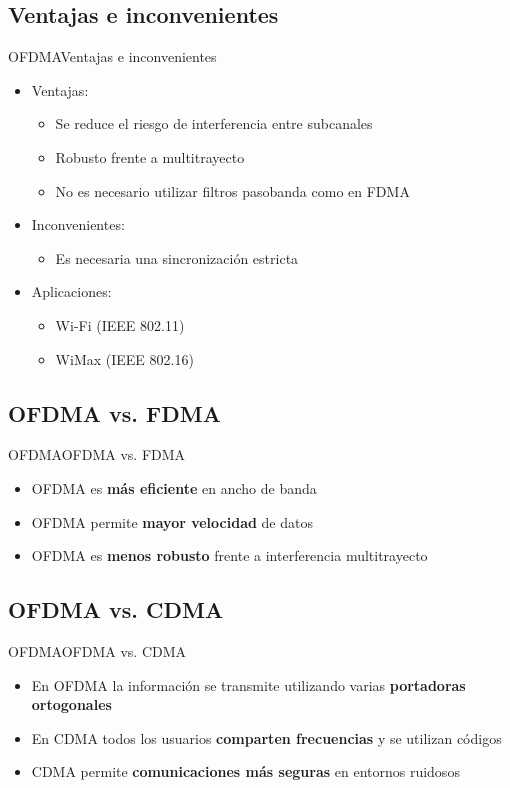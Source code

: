 \documentclass[10pt,compress]{beamer} %
\begin{document}
\subsection{Ventajas e inconvenientes}
\begin{frame}{OFDMA}{Ventajas e inconvenientes}
  \begin{itemize}
    \item Ventajas:
      \begin{itemize}
        \item Se reduce el riesgo de interferencia entre subcanales
        \item Robusto frente a multitrayecto
        \item No es necesario utilizar filtros pasobanda como en FDMA
      \end{itemize}
    \item Inconvenientes:
      \begin{itemize}
        \item Es necesaria una sincronización estricta
      \end{itemize}
    \item Aplicaciones:
      \begin{itemize}
        \item Wi-Fi (IEEE 802.11)
        \item WiMax (IEEE 802.16)
      \end{itemize}
  \end{itemize}
\end{frame}

\subsection{OFDMA vs. FDMA}
\begin{frame}{OFDMA}{OFDMA vs. FDMA}
  \begin{itemize}
    \item OFDMA es {\bf más eficiente} en ancho de banda
    \item OFDMA permite {\bf mayor velocidad} de datos 
    \item OFDMA es {\bf menos robusto} frente a interferencia multitrayecto
  \end{itemize}
\end{frame}

\subsection{OFDMA vs. CDMA}
\begin{frame}{OFDMA}{OFDMA vs. CDMA}
  \begin{itemize}
    \item En OFDMA la información se transmite utilizando varias {\bf portadoras ortogonales}
    \item En CDMA todos los usuarios {\bf comparten frecuencias} y se utilizan códigos
    \item CDMA permite {\bf comunicaciones más seguras} en entornos ruidosos
  \end{itemize}
\end{frame}
\end{document}
